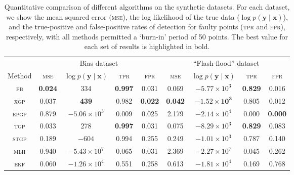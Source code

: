 \documentclass[twoside]{article}
\newcommand{\given}{\!\ensuremath{\mid}\!}
\newcommand{\bm}[1]{\ensuremath{\mathbf{#1}}}
\begin{document}
\begin{table}
  \centering
  \caption{Quantitative comparison of different algorithms on the
    synthetic datasets.  For each dataset, we show the mean squared error
    (\textsc{mse}), the log likelihood of the true data ($\log p(\bm{y}
    \given \bm{x})$), and the true-positive and false-positive rates
    of detection for faulty points (\textsc{tpr} and \textsc{fpr}),
    respectively, with all methods permitted a `burn-in' period of 50 points. The best value for each set of results is highlighted in
    bold.}
  \label{tbl:results}
  \begin{tabular}{ccccccccc}
    \toprule
& \multicolumn{4}{c}{Bias dataset} & \multicolumn{4}{c}{``Flash-flood'' dataset}\\
    \cmidrule(l){2-5} \cmidrule(l){6-9}
    Method & \scshape{mse} & $\log p(\bm{y}\given\bm{x})$ & \scshape{tpr} & \scshape{fpr} 
& \scshape{mse} & $\log p(\bm{y}\given\bm{x})$ & \scshape{tpr} & \scshape{fpr} \\
\midrule
    \scshape{fb} & \textbf{0.024} & 334 & \textbf{0.997} & 0.031 & 0.069 & $-5.77\times 10^3$ & \textbf{0.829} & {0.016} \\
    \scshape{xgp} & 0.037 & \textbf{439} & 0.982 & \textbf{0.022} & \textbf{0.042} & $\mathbf{-1.52 \times 10^3}$ & 0.805 & 0.012 \\
\scshape{epgp} & 0.879 & $-5.06 \times 10^3$ & 0.009 & 0.025 
	       & 2.179 & $-2.14 \times 10^4$ & 0.000 & \textbf{0.000} \\ 
    \scshape{tgp} & 0.033 & 278 & \textbf{0.997} & 0.031 & 0.075 & $-8.29\times 10^3$ & \textbf{0.829} & 0.083 \\
   \scshape{stgp} & 0.189 & $-604$ & 0.994 & 0.255 &
		  0.249 & $-1.01\times 10^3$ & 0.787 & 0.140\\
    \scshape{mlh} & 0.940 & $-5.43\times 10^7$ & 0.065 & 0.031 & 2.369 & $-2.27\times 10^7$ & 0.045 & 0.262 \\
   \scshape{ekf} & 0.060 & $-1.26 \times 10^4$ & 0.551 & 0.258 & 0.613 & $-1.81\times 10^4$ & 0.169 & 0.768 \\
    \bottomrule
  \end{tabular}
\end{table}
\end{document}
